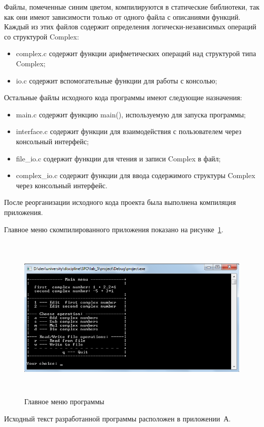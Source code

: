 Файлы, помеченные синим цветом, компилируются в статические библиотеки,
так как они имеют зависимости только от одного файла с описаниями функций.
Каждый из этих файлов содержит определения логически-независимых операций со 
структурой Complex:

\begin{itemize}
  \item complex.c содержит функции арифметических операций над структурой типа Complex;
  \item io.c содержит вспомогательные функции для работы с консолью;
\end{itemize} 

Остальные файлы исходного кода программы имеют следующие назначения:
\begin{itemize}
  \item main.c содержит функцию main(), используемую для запуска программы;
  \item interface.c содержит функции для взаимодействия с пользователем через
    консольный интерфейс;
  \item file\_io.c содержит функции для чтения и записи Complex в файл;
  \item complex\_io.c содержит функции для ввода содержимого структуры Complex через
    консольный интерфейс.
\end{itemize}

После реорганизации исходного кода проекта была выполнена компиляция приложения.

Главное меню скомпилированного приложения показано на рисунке~\ref{fig:main_menu}.

\begin{figure}[htbp]
  \centering
  \includegraphics[width=150mm,height=80mm]{img/main_menu}
  \caption{Главное меню программы}\label{fig:main_menu}
\end{figure}

Исходный текст разработанной программы расположен в приложении~А.

\newpage